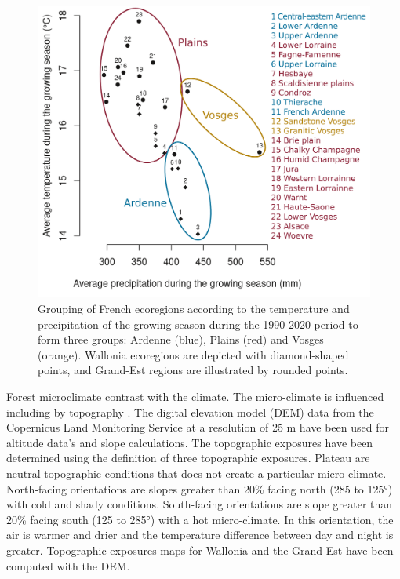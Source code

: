 \documentclass[3p,procedia]{elsarticle}
\begin{document}
\begin{figure}[htbp] 
	\centering
	\includegraphics[width=0.8\linewidth]{climat/climat_region.png}
	\caption{Grouping of French ecoregions according to the temperature and precipitation of the growing season during the 1990-2020 period to form three groups: Ardenne (blue), Plains (red) and Vosges (orange). Wallonia ecoregions are depicted with diamond-shaped points, and Grand-Est regions are illustrated by rounded points.}
	\label{fig:clim}
\end{figure}

Forest microclimate contrast with the climate.
The micro-climate is influenced including by topography \citep{de_frenne_forest_2021}.
The digital elevation model (DEM) data from the Copernicus Land Monitoring Service \citep{DEM_copernicus} at a resolution of 25 m have been used for altitude data's and slope calculations.
The topographic exposures have been determined using the \cite{Delvaux_galoux} definition of three topographic  exposures.
Plateau are neutral topographic conditions that does not create a particular micro-climate. 
North-facing orientations are slopes greater than  20\% facing north (285 to 125°) with cold and shady conditions.
South-facing orientations are slope greater than  20\% facing south (125 to 285°) with a hot micro-climate.
In this orientation, the air is warmer and drier and the temperature difference between day and night is greater.
Topographic exposures maps for Wallonia and the Grand-Est have been computed with the DEM. 
\end{document}
